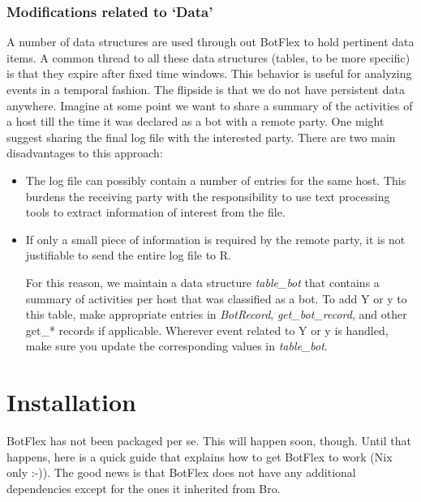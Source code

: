 \documentclass[acmtocl]{acmtrans2m}
\begin{document}
\subsubsection{Modifications related to `Data'}
A number of data structures are used through out BotFlex
to hold pertinent data items. A common thread to all these
data structures (tables, to be more specific) is that they
expire after fixed time windows. This behavior is useful for
analyzing events in a temporal fashion. The flipside is that
we do not have persistent data anywhere. Imagine at some point
we want to share a summary of the activities of a host till the 
time it was declared as a bot with a remote party. One might 
suggest sharing the final log file with the interested party.
There are two main disadvantages to this approach:
\begin{itemize}
\item The log file can possibly contain a number of entries
for the same host. This burdens the receiving party with
the responsibility to use text processing tools to extract 
information of interest from the file.
\item If only a small piece of information is required by the 
remote party, it is not justifiable to send the entire log file
to R. 
  
For this reason, we maintain a data structure \textit{table\_bot}
that contains a summary of activities per host that was classified
as a bot. To add Y or y to this table, make appropriate entries in
\textit{BotRecord}, \textit{get\_bot\_record}, and other get\_* records if 
applicable. Wherever event related to Y or y is handled, make sure 
you update the corresponding values in \textit{table\_bot}.
\end{itemize}
      
\section{Installation}
BotFlex has not been packaged per se. 
This will happen soon, though. 
Until that happens, here is a quick guide that explains 
how to get BotFlex to work (Nix only :-)). 
The good news is that BotFlex does not have any
additional dependencies except for the ones it 
inherited from Bro. 
\end{document}

